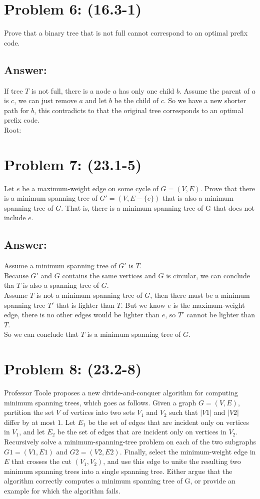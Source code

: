 \documentclass[a4paper]{article}
\begin{document}
\section*{Problem 6: (16.3-1)} Prove that a binary tree that is not full cannot correspond to an optimal prefix code.
\subsection*{Answer:}
If tree $T$ is not full, there is a node $a$ has only one child $b$. Assume the parent of $a$ is $c$, we can just remove $a$ and let $b$ be the child of $c$. So we have a new shorter path for $b$, this contradicts to that the original tree corresponds to an optimal prefix code.\\
Root:

\section*{Problem 7: (23.1-5)} Let $e$ be a maximum-weight edge on some cycle of $G = (V, E)$. Prove that there is a minimum spanning tree of $G' = (V, E -\{e\})$ that is also a minimum spanning tree of $G$. That is, there is a minimum spanning tree of G that does not include $e$.
\subsection*{Answer:}
Assume a minimum spanning tree of $G'$ is $T$.\\
Because $G'$ and $G$ contains the same vertices and $G$ is circular, we can conclude tha $T$ is also a spanning tree of $G$.\\
Assume $T$ is not a minimum spanning tree of $G$, then there must be a minimum spanning tree $T'$ that is lighter than $T$. But we know $e$ is the maximum-weight edge, there is no other edges would be lighter than $e$, so $T'$ cannot be lighter than $T$.\\
So we can conclude that $T$ is a  minimum spanning tree of $G$.

\section*{Problem 8: (23.2-8)} Professor Toole proposes a new divide-and-conquer algorithm for computing minimum spanning trees, which goes as follows. Given a graph $G = (V, E)$, partition the set $V$ of vertices into two sets $V_1$ and $V_2$ such that $|V1|$ and $|V2|$ differ by at most $1$. Let $E_1$ be the set of edges that are incident only on vertices in $V_1$, and let $E_2$ be the set of edges that are incident only on vertices in $V_2$. Recursively solve a minimum-spanning-tree problem on each of the two subgraphs $G1 = (V1, E1)$ and $G2 = (V2, E2)$. Finally, select the minimum-weight edge in $E$ that crosses the cut $(V_1, V_2)$, and use this edge to unite the resulting two minimum spanning trees into a single spanning tree. Either argue that the algorithm correctly computes a minimum spanning tree of G, or provide an example for which the algorithm fails.
\end{document}
